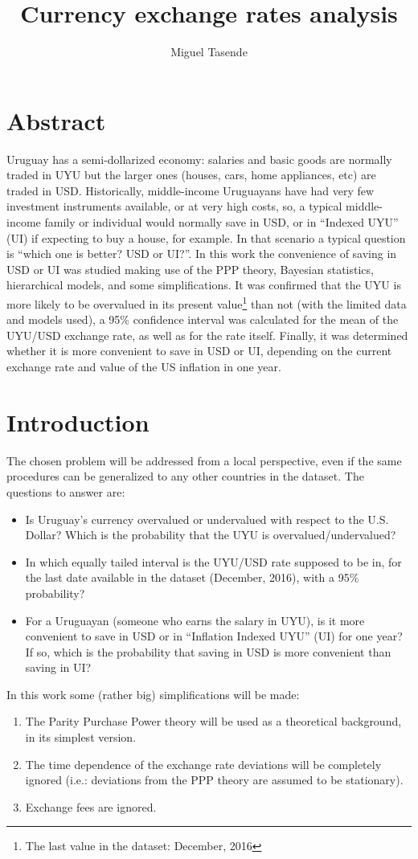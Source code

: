 \documentclass[a4paper,12pt]{article}
\title{\textbf{Currency exchange rates analysis}}
\author{Miguel Tasende}
\begin{document}
\maketitle

\section{Abstract}
Uruguay has a semi-dollarized economy: salaries and basic goods are normally traded in UYU but the larger ones (houses, cars, home appliances, etc) are traded in USD. Historically, middle-income Uruguayans have had very few investment instruments available, or at very high costs, so, a typical middle-income family or individual would normally save in USD, or in ``Indexed UYU'' (UI) if expecting to buy a house, for example. In that scenario a typical question is ``which one is better? USD or UI?''. In this work the convenience of saving in USD or UI was studied making use of the PPP theory, Bayesian statistics, hierarchical models, and some simplifications. It was confirmed that the UYU is more likely to be overvalued in its present value\footnote{The last value in the dataset: December, 2016\label{ref1}} than not (with the limited data and models used), a 95\% confidence interval was calculated for the mean of the UYU/USD exchange rate, as well as for the rate itself. Finally, it was determined whether it is more convenient to save in USD or UI, depending on the current exchange rate and value of the US inflation in one year.

\section{Introduction}
The chosen problem will be addressed from a local perspective, even if the same procedures can be generalized to any other countries in the dataset. The questions to answer are: 
\begin{itemize}
\item Is Uruguay's currency overvalued or undervalued with respect to the U.S. Dollar? Which is the probability that the UYU is overvalued/undervalued?
\item In which equally tailed interval is the UYU/USD rate supposed to be in, for the last date available in the dataset (December, 2016), with a 95\% probability?
\item For a Uruguayan (someone who earns the salary in UYU), is it more convenient to save in USD or in ``Inflation Indexed UYU'' (UI) for one year? If so, which is the probability that saving in USD is more convenient than saving in UI?
\end{itemize}
In this work some (rather big) simplifications will be made:
\begin{enumerate}
\item The Parity Purchase Power theory will be used as a theoretical background, in its simplest version.
\item The time dependence of the exchange rate deviations will be completely ignored (i.e.: deviations from the PPP theory are assumed to be stationary).
\item Exchange fees are ignored.
\end{enumerate}
\end{document}
